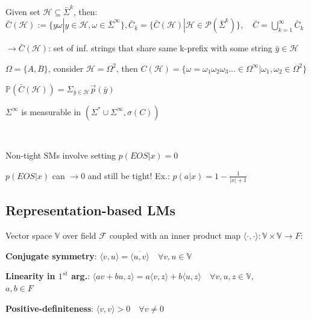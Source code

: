  Given set \(\mathcal{H}\subseteq\bar{\Sigma}^k\), then:
$\bar{C}(\mathcal{H}) := \{y\omega|y\in\mathcal{H},\omega\in\bar{\Sigma}^\infty\},
\bar{C}_k = \{\bar{C}(\mathcal{H})|\mathcal{H}\in\mathcal{P}(\bar{\Sigma}^k)\}, \quad\bar{C} = \bigcup_{k=1}^\infty \bar{C}_k$

\textcolor{mygray}{$\to \bar{C}(\mathcal{H})$: set of inf. strings that share same k-prefix with some string \(\bar{y}\in\mathcal{H}\)}

\example \(\Omega = \{A, B\}\), consider \(\mathcal{H}=\Omega^2\), then \(C(\mathcal{H})=\{\omega=\omega_1\omega_2\omega_3...\in\Omega^\infty|\omega_1,\omega_2\in\Omega^2\}\)

\theorem \(\mathbb{P}(\bar{C}(\mathcal{H}))=\Sigma_{\bar{y}\in\mathcal{H}} \overrightarrow{p}(\bar{y})\)

\lemma \(\Sigma^\infty\) is measurable in \((\Sigma^* \cup \Sigma^\infty, \sigma(C))\)

\comment \\
\begin{enumerate*}[label=\textbullet, itemjoin={\quad}]
    \item Non-tight SMs involve setting \(p(EOS|x) = 0\)
    \item \(p(EOS|x)\) can \(\rightarrow0\) and still be tight! Ex.: \(p(a|x) = 1 - \frac{1}{|x|+1}\)
\end{enumerate*}

\subsection{Representation-based LMs}
 Vector space \(\mathbb{V}\) over field \(\mathcal{F}\) coupled with an inner product map 
\(\langle \cdot , \cdot \rangle : \mathbb{V} \times \mathbb{V} \to F\):\\
\begin{enumerate*}[label=\roman*, itemjoin={\quad}]
    \item \textbf{Conjugate symmetry}:
    $\langle v, u \rangle = \overline{\langle u, v \rangle} \quad \forall v, u \in \mathbb{V}$

    \item \textbf{Linearity in $1^{st}$ arg.}:
    $\langle av + bu, z \rangle = a\langle v, z \rangle + b\langle u, z \rangle \quad \forall v, u, z \in \mathbb{V},$\\
    $ a, b \in F$

    \item \textbf{Positive-definiteness}:
    $\langle v, v \rangle > 0 \quad \forall v \neq 0$
\end{enumerate*}

